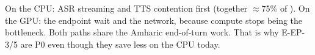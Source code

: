\begin{finding}
On the CPU: ASR streaming and TTS contention first (together $\approx$75\% of \ttfa). On the GPU: the
endpoint wait and the network, because compute stops being the bottleneck. Both paths share the
Amharic end-of-turn work. That is why E-EP-3/5 are P0 even though they save less on the CPU today.
\end{finding}
